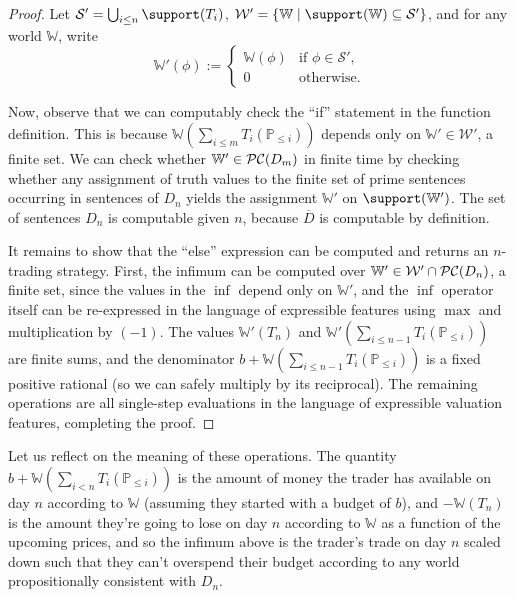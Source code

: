 \documentclass[authordate,onecolumn,noenvironments]{miri-tech-article}
\numberwithin{equation}{subsection}
\newcommand{\seq}[1]{{\overline{#1}}}
\newcommand{\mm}{m}
\newcommand{\nn}{n}
\newcommand{\trade}{T}%
\newcommand{\BelState}{\mathbb{P}}
\newcommand{\pt}{\BelState}
\newcommand{\dt}{D}
\newcommand{\DP}{\seq{\dt}}
\newcommand{\pcworlds}{\mathcal{P\-C}}
\newcommand{\World}{\mathbb{W}}
\newcommand{\Worlds}{\mathcal{W}}
\newcommand{\Sentences}{\mathcal{S}}
\begin{document}
\begin{proof}
Let $\Sentences'=\bigcup_{i\le\nn}\support(\trade_i)$, $\Worlds' = \{\World \mid \support(\World)\subseteq \Sentences'\}$, and for any world $\World$, write
\[
  \World'(\phi) := 
  \begin{cases}
    \World(\phi) &\mbox{if $\phi\in\Sentences'$,}\\
    0 &\mbox{otherwise.}
  \end{cases}
\]

Now, observe that we can computably check the ``if'' statement in the function definition.  This is because $\World({\textstyle \sum_{i \leq m} \trade_{i}(\pt_{\leq i})})$ depends only on $\World' \in\Worlds'$, a finite set.  We can check whether $\World'\in\pcworlds(\dt_\mm)$ in finite time by checking whether any assignment of truth values to the finite set of prime sentences occurring in sentences of $\dt_\nn$  yields the assignment $\World'$ on $\support(\World')$. The set of sentences $\dt_\nn$ is computable given $n$, because $\DP$ is computable by definition.

It remains to show that the ``else'' expression can be computed and returns an $\nn$-trading strategy.  First, the infimum can be computed over $\World' \in \Worlds' \cap \pcworlds(\dt_\nn)$, a finite set, since the values in the $\inf$ depend only on $\World'$, and the $\inf$ operator itself can be re-expressed in the language of expressible features using $\max$ and multiplication by $(-1)$.  The values $\World'(\trade_\nn)$ and $\World'(\sum_{i \leq \nn-1} \trade_{i}(\pt_{\leq i}))$ are finite sums, and the denominator ${b+\World({\textstyle \sum_{i \leq \nn-1} \trade_{i}(\pt_{\leq i})} )}$ is a fixed positive rational (so we can safely multiply by its reciprocal).  The remaining operations are all single-step evaluations in the language of expressible valuation features, completing the proof.
\end{proof}

\noindent Let us reflect on the meaning of these operations.  The quantity $b + \World(\sum_{i<\nn}\trade_i(\pt_{\leq i}) )$ is the amount of money the trader has available on day $\nn$ according to $\World$ (assuming they started with a budget of $b$), and $-\World(\trade_\nn)$ is the amount they're going to lose on day $\nn$ according to $\World$ as a function of the upcoming prices, and so the infimum above is the trader's trade on day $\nn$ scaled down such that they can't overspend their budget according to any world propositionally consistent with $\dt_\nn$.
\end{document}
